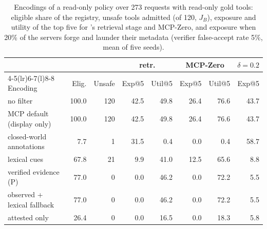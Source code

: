 \begin{table}[t]
\centering
\caption{Encodings of a read-only policy over 273 requests with read-only gold tools: eligible share of the
registry, unsafe tools admitted (of 120, $J_B$), exposure and utility of the top five for \pamcp{}'s retrieval
stage and MCP-Zero, and exposure when 20\% of the servers forge and launder their metadata (verifier
false-accept rate 5\%, mean of five seeds).}
\label{tab:ev-encodings}
\scriptsize
\setlength{\tabcolsep}{2.2pt}
\begin{tabular}{@{}lrrrrrrr@{}}
\toprule
 & & & \multicolumn{2}{c}{\pamcp{} retr.} & \multicolumn{2}{c}{MCP-Zero} & $\delta{=}0.2$ \\
\cmidrule(lr){4-5}\cmidrule(lr){6-7}\cmidrule(l){8-8}
Encoding & Elig. & Unsafe & Exp@5 & Util@5 & Exp@5 & Util@5 & Exp@5 \\
\midrule
no filter & 100.0 & 120 & 42.5 & 49.8 & 26.4 & 76.6 & 43.7 \\
MCP default (display only) & 100.0 & 120 & 42.5 & 49.8 & 26.4 & 76.6 & 43.7 \\
closed-world annotations & 7.7 & 1 & 31.5 & 0.4 & 0.0 & 0.4 & 58.7 \\
lexical cues & 67.8 & 21 & 9.9 & 41.0 & 12.5 & 65.6 & 8.8 \\
verified evidence (P) & 77.0 & 0 & 0.0 & 46.2 & 0.0 & 72.2 & 5.5 \\
observed + lexical fallback & 77.0 & 0 & 0.0 & 46.2 & 0.0 & 72.2 & 5.5 \\
attested only & 26.4 & 0 & 0.0 & 16.5 & 0.0 & 18.3 & 5.8 \\
\bottomrule
\end{tabular}
\end{table}
